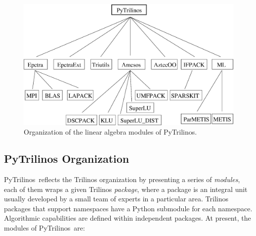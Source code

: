 \documentclass[10pt,relax]{SANDreport}
\newcommand{\PyTrilinos}{{PyTrilinos}}
\begin{document}
\begin{figure}
\begin{center}
\includegraphics[width=12cm]{../UsersGuide/organization.eps}
\caption{Organization of the linear algebra modules of PyTrilinos.}
\label{fig:organization}
\end{center}
\end{figure}

\subsection{PyTrilinos Organization}
\label{sec:organization}

\PyTrilinos\ reflects the Trilinos organization by presenting a series
of {\sl modules}, each of them wraps a given Trilinos {\sl package},
 where a package is an integral unit usually
developed by a small team of experts in a particular area.
Trilinos packages that support namespaces have a Python submodule for
each namespace.  Algorithmic capabilities are defined within
independent packages. At present, the modules of \PyTrilinos\ are:
\end{document}
